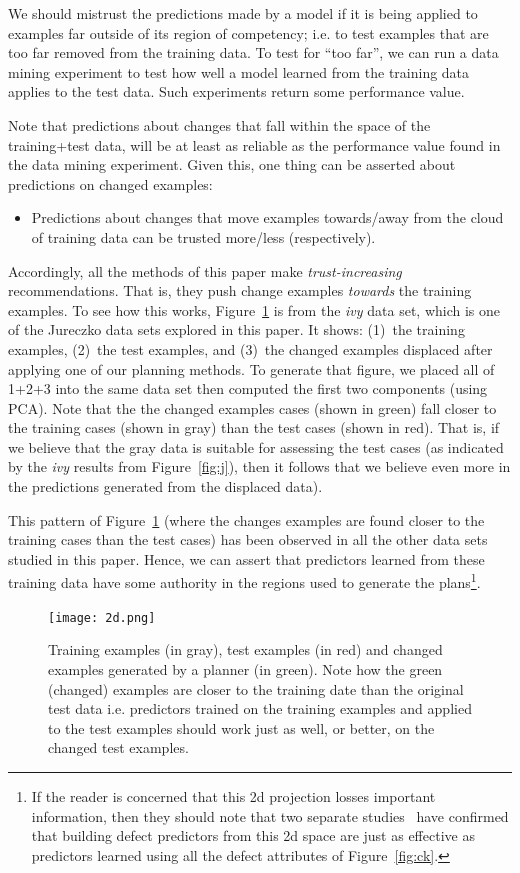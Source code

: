 \documentclass{sig-alternate}
\newcommand{\bi}{\begin{itemize}}
\newcommand{\ei}{\end{itemize}}
\newcommand{\fig}[1]{Figure~\ref{fig:#1}}
\begin{document}
We should mistrust the predictions made by a  model   if it is being applied to examples far outside of its region of competency;
i.e. to test examples that are too far removed from the training data.   
To test for ``too far'', we can run a data mining experiment to test how well
a model learned from the training data applies to the test data. Such experiments return some performance value.

Note that predictions  about changes that  fall within the space of the training+test data, will be at least
as reliable as the performance value found in the data mining experiment.
Given this, one thing  can be asserted about predictions on changed examples:
\bi
\item Predictions about changes that move examples towards/away from the cloud of training data can be trusted more/less (respectively).
\ei  
Accordingly, all the methods of this paper make {\em trust-increasing} recommendations. That is, they push change examples {\em towards} the
training examples.  To see how this works, 
 \fig{howxy} is from the {\em ivy} data
set, which is one of the Jureczko data sets explored in this paper. It shows: (1)~the training examples, (2)~the test examples, and (3)~the
changed  examples displaced after applying one of our planning methods.
To generate that figure, we placed all of 1+2+3 into the same data set then computed the first
two  components (using PCA). Note that the  the   changed examples
cases  (shown in green)  fall closer to the training cases (shown in gray) than
the test cases (shown in red).  That is, if we believe
that the gray data is  suitable for assessing
the test cases (as indicated by the {\em ivy} results from \fig{j}), then it follows
that we believe even more in the predictions
generated from the displaced data).



This pattern of \fig{howxy} (where the changes examples are found closer to  the training cases than the test cases) has been observed in all the other data sets studied in this
paper. Hence,  we can assert that
predictors learned from these training data have some authority in the regions
used to generate the plans\footnote{If the reader is concerned that this 2d projection
losses important information, then they should note that two separate  studies~\cite{papa13,divya15}
have confirmed that building defect predictors from this 2d space are just as effective
as predictors learned using all the defect attributes of \fig{ck}.}. 


\begin{figure}[!t]
  \texttt{[image: 2d.png]} 
\caption{Training examples (in gray), test examples (in red) and 
changed examples generated by a planner (in green). Note how the green (changed) examples are closer to the  training
date than the original test data
i.e. predictors trained on the training examples and
applied to the test examples should
work just as well, or better, on the changed test examples.}\label{fig:howxy}
\end{figure}
\end{document}
